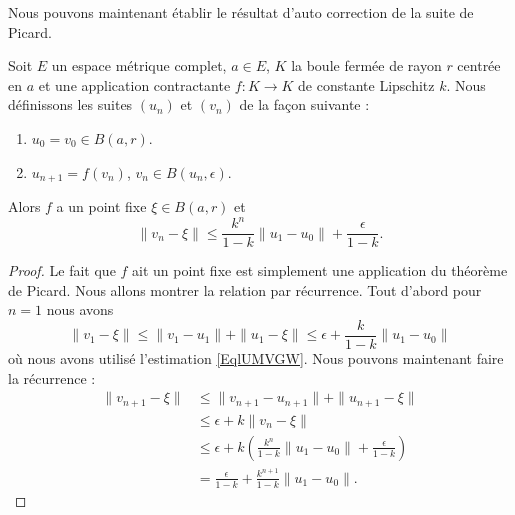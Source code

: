 Nous pouvons maintenant établir le résultat d'auto correction de la suite de Picard.
\begin{proposition}
    Soit \( E\) un espace métrique complet, \( a\in E\), \( K\) la boule fermée de rayon \( r\) centrée en \( a\) et une application contractante \( f\colon K\to K\) de constante Lipschitz \( k\). Nous définissons les suites \( (u_n)\) et \( (v_n)\) de la façon suivante :
    \begin{enumerate}
        \item
            \( u_0=v_0\in B(a,r)\).
        \item
            \( u_{n+1}=f(v_n)\), \( v_n\in B(u_n,\epsilon)\).
    \end{enumerate}
    Alors \( f\) a un point fixe \( \xi\in B(a,r)\) et 
    \begin{equation}
        \| v_n-\xi \|\leq \frac{ k^n }{ 1-k }\| u_1-u_0 \|+\frac{ \epsilon }{ 1-k }.
    \end{equation}
\end{proposition}

\begin{proof}
    Le fait que \( f\) ait un point fixe est simplement une application du théorème de Picard. Nous allons montrer la relation par récurrence. Tout d'abord pour \( n=1\) nous avons
    \begin{equation}
        \| v_1-\xi \|\leq\| v_1-u_1 \|+\| u_1-\xi \|\leq \epsilon+\frac{ k }{ 1-k }\| u_1-u_0 \|
    \end{equation}
    où nous avons utilisé l'estimation \eqref{EqlUMVGW}. Nous pouvons maintenant faire la récurrence :
    \begin{subequations}
        \begin{align}
            \| v_{n+1}-\xi \|&\leq \| v_{n+1}-u_{n+1} \|+\| u_{n+1}-\xi \|\\
            &\leq \epsilon+k\| v_n-\xi \|\\
            &\leq \epsilon+k\left( \frac{ k^n }{ 1-k }\| u_1-u_0 \|+\frac{ \epsilon }{ 1-k } \right)\\
            &=\frac{ \epsilon }{ 1-k }+\frac{ k^{n+1} }{ 1-k }\| u_1-u_0 \|.
        \end{align}
    \end{subequations}
\end{proof}
